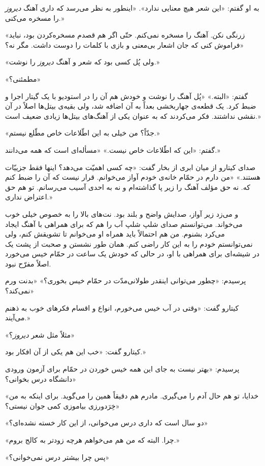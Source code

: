 \documentclass[a5paper]{book}
\begin{document}
به او گفتم: «این شعر هیچ معنایی ندارد». «اینطور به نظر می‌رسد که داری آهنگ \emph{دیروز} را مسخره می‌کنی.»

«زرنگی نکن. آهنگ را مسخره نمی‌کنم. حتّی اگر هم قصدم مسخره‌کردن بود، نباید فراموش کنی که جان اشعار بی‌معنی و بازی با کلمات را دوست داشت. مگر نه؟»

«ولی پُل کسی بود که شعر و آهنگ \emph{دیروز} را نوشت.»

«مطمئنی؟»

گفتم: «البته.» «پُل آهنگ را نوشت و خودش هم آن را در استودیو با یک گیتار اجرا و ضبط کرد. یک قطعه‌ی جهاربخشی بعداً به آن اضافه شد، ولی بقیه‌ی بیتل‌ها اصلاً در آن نقشی نداشتند. فکر می‌کردند که به عنوان یکی از آهنگ‌های بیتل‌ها زیادی ضعیف است.»

«جدّاً؟ من خیلی به این اطّلاعات خاص مطّلع نیستم.»

گفتم: «این که اطّلاعات خاص نیست.» «مسأله‌ای است که همه می‌دانند.»

صدای کیتارو از میان ابری از بخار گفت: «چه کسی اهمیّت می‌دهد؟ اینها فقط جزيیّات هستند.» «من دارم در حمّام خانه‌ی خودم آواز می‌خوانم. قرار نیست که آن را ضبط کنم که. نه حق مؤلف آهنگ را زیر پا گذاشته‌ام و نه به احدی آسیب می‌رسانم. تو هم حق اعتراض نداری.»

و می‌زد زیر آواز، صدایش واضح و بلند بود. نت‌های بالا را به خصوص خیلی خوب می‌خواند. می‌توانستم صدای شلپ شلپ آب را هم که برای همراهی با آهنگ ایجاد می‌کرد بشنوم. من هم احتمالاً باید همراه او می‌خوانم تا تشویقش کنم، ولی نمی‌توانستم خودم را به این کار راضی کنم. همان طور نشستن و صحبت از پشت یک در شیشه‌ای برای همراهی با او، در حالی که خودش یک ساعت در حمّام خیس می‌خورد اصلاً مفرّح نبود.

پرسیدم: «چطور می‌توانی اینقدر طولانی‌مدّت در حمّام خیس بخوری؟» «بدنت ورم نمی‌کند؟»

کیتارو گفت: «وقتی در آب خیس می‌خورم، انواع و اقسام فکرهای خوب به ذهنم می‌آیند.»

«مثلاً مثل شعر \emph{دیروز}؟»

کیتارو گفت: «خب این هم یکی از آن افکار بود.»

پرسیدم: «بهتر نیست به جای این همه خیس خوردن در حمّام برای آزمون ورودی دانشگاه درس بخوانی؟»

«خدایا، تو هم حال آدم را می‌گیری. مادرم هم دقیقاً همین را می‌گوید. برای اینکه به من خِرَدورزی بیاموزی کمی جوان نیستی؟»

«دو سال است که داری درس می‌خوانی، از این کار خسته نشده‌ای؟»

«چرا. البته که من هم می‌خواهم هرچه زودتر به کالج بروم.»

«پس چرا بیشتر درس نمی‌خوانی؟»
\end{document}
